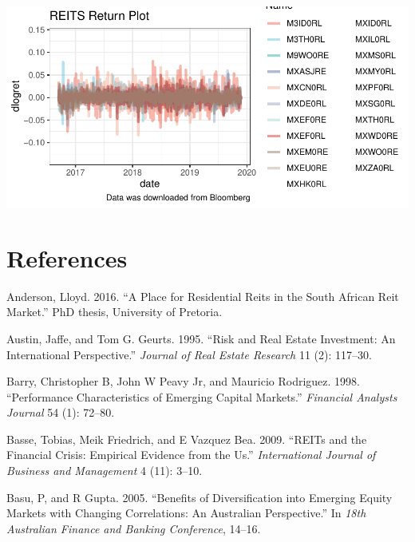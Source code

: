 \documentclass[11pt,preprint, authoryear]{elsarticle}
\let\origfigure\figure
\let\endorigfigure\endfigure
\renewenvironment{figure}[1][2] {
    \expandafter\origfigure\expandafter[H]
} {
    \endorigfigure
}
\numberwithin{equation}{section}
\numberwithin{figure}{section}
\numberwithin{table}{section}
\begin{document}
\begin{figure}[H]

{\centering \includegraphics{Template_files/figure-latex/figure3-1} 

}

\caption{Daily log Reits Returns \label{Figure3}}\label{fig:figure3}
\end{figure}

\hypertarget{references}{%
\section*{References}\label{references}}

\hypertarget{refs}{}
\leavevmode\hypertarget{ref-anderson2016place}{}%
Anderson, Lloyd. 2016. ``A Place for Residential Reits in the South
African Reit Market.'' PhD thesis, University of Pretoria.

\leavevmode\hypertarget{ref-austin1995risk}{}%
Austin, Jaffe, and Tom G. Geurts. 1995. ``Risk and Real Estate
Investment: An International Perspective.'' \emph{Journal of Real Estate
Research} 11 (2): 117--30.

\leavevmode\hypertarget{ref-barry1998performance}{}%
Barry, Christopher B, John W Peavy Jr, and Mauricio Rodriguez. 1998.
``Performance Characteristics of Emerging Capital Markets.''
\emph{Financial Analysts Journal} 54 (1): 72--80.

\leavevmode\hypertarget{ref-basse2009reits}{}%
Basse, Tobias, Meik Friedrich, and E Vazquez Bea. 2009. ``REITs and the
Financial Crisis: Empirical Evidence from the Us.'' \emph{International
Journal of Business and Management} 4 (11): 3--10.

\leavevmode\hypertarget{ref-basu2005benefits}{}%
Basu, P, and R Gupta. 2005. ``Benefits of Diversification into Emerging
Equity Markets with Changing Correlations: An Australian Perspective.''
In \emph{18th Australian Finance and Banking Conference}, 14--16.
\end{document}
